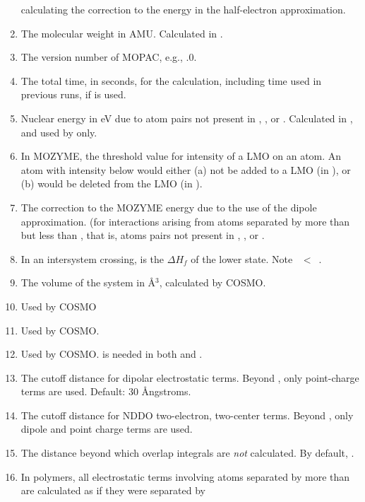 \begin{enumerate}
calculating the correction to the energy in the half-electron approximation.
\item {} The molecular weight in AMU.  Calculated in .
\item {} The version number of MOPAC, e.g., \mopacversion .0.
\item {} The total time, in seconds, for the calculation,
including time used in previous runs, if  is used.
\item {} Nuclear energy in eV due to atom pairs not present in
, , or . Calculated in , and
used by  only.
\item {} In MOZYME, the threshold value for intensity of a
LMO on an atom.  An atom with intensity below  would either
(a) not be added to a LMO (in ), or (b) would be deleted from the
 LMO (in ).
\addtocounter{enumi}{2}
\item {} The correction to the MOZYME energy due to the use of the
dipole approximation. (for interactions arising from atoms separated
by more than  but less than , that is, atoms pairs
not present in , , or .
\item {} In an intersystem crossing,  is the $\Delta H_f$
 of the lower state.  Note \mbox{ $<$ }.
\item {} The volume of the system in \AA $^3$, calculated by COSMO.
\item {} Used by COSMO
\item {}  Used by COSMO.
\item {} Used by COSMO.   is needed in both 
and .
\item {} The cutoff distance for dipolar electrostatic terms.  Beyond
, only point-charge terms are used.  Default: 30 \AA ngstroms.
\item {} The cutoff distance for NDDO two-electron, two-center terms.
Beyond , only dipole and point charge terms are used.
\item {} The distance beyond which overlap integrals are {\em not}
calculated.  By default, .
\item {} In polymers, all electrostatic terms involving
atoms separated
by more than  are calculated as if they were separated by

\end{enumerate}
